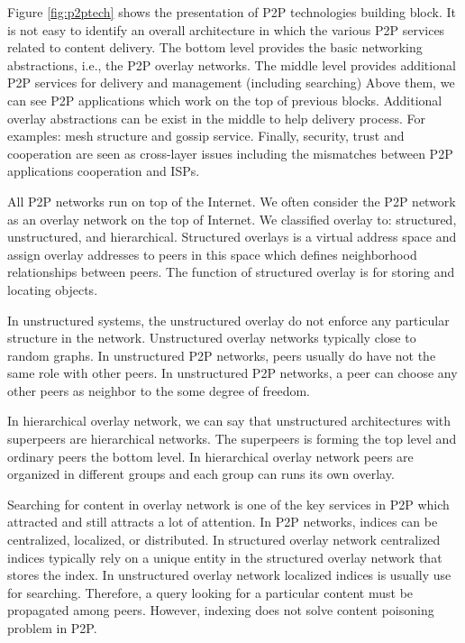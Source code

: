 Figure \ref{fig:p2ptech} shows the presentation of P2P technologies building block.
It is not easy to identify an overall architecture in which the various P2P services related to content delivery. 
The bottom level provides the basic networking abstractions, i.e., the P2P overlay networks. 
The middle level provides additional P2P services for delivery and management (including searching)
Above them, we can see P2P applications which work on the top of previous blocks.
Additional overlay abstractions can be exist in the middle to help delivery process. 
For examples:  mesh structure and gossip service.
Finally, security, trust and cooperation are seen as cross-layer issues including the mismatches between P2P applications cooperation and ISPs.

All P2P networks run on top of the Internet. 
We often consider the P2P network as an overlay network on the top of Internet. 
We classified overlay to: structured, unstructured, and hierarchical. 
Structured overlays is a virtual address space and assign overlay addresses to peers in this space which defines neighborhood relationships between peers.
The function of structured overlay is for storing and locating objects. 

In unstructured systems, the unstructured overlay do not enforce any particular structure in the network. 
Unstructured overlay networks typically close to random graphs. 
In unstructured P2P networks, peers usually do have not the same role with other peers.
In unstructured P2P networks, a peer can choose any other peers as neighbor to the some degree of freedom.  

In hierarchical overlay network, we can say that unstructured architectures with superpeers are hierarchical networks.
The superpeers is forming the top level and ordinary peers the bottom level.
In hierarchical overlay network peers are organized in different groups and each group can runs its own overlay. 

Searching for content in overlay network is one of the key services in P2P which attracted  and still attracts a lot of attention.
In P2P networks, indices can be centralized, localized, or distributed. 
In structured overlay network centralized indices typically rely on a unique entity in the structured overlay network that stores the index. 
In unstructured overlay network localized indices is usually use for searching. 
Therefore, a query looking for a particular content must be propagated among peers.
However, indexing does not solve content poisoning problem in P2P.

